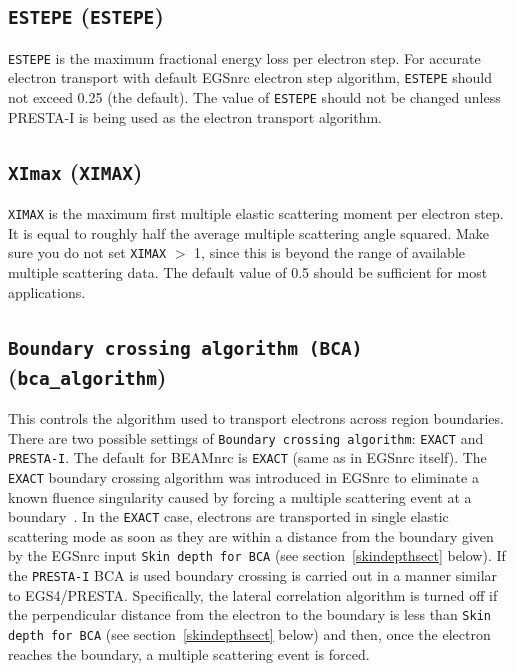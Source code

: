 \documentclass[12pt,twoside]{article}
\begin{document}
\subsection{{\tt ESTEPE} ({\tt ESTEPE})}
\label{ESTEPE}
{\tt ESTEPE} is the maximum fractional energy loss per electron step.
For accurate electron transport with default EGSnrc electron
step algorithm,  {\tt ESTEPE} should
not exceed 0.25 (the default).  The value of {\tt ESTEPE} should not be changed
unless PRESTA-I is being used as
the electron transport algorithm.

\subsection{{\tt XImax} ({\tt XIMAX})}
{\tt XIMAX} is the maximum first multiple elastic scattering moment per electron
step.  It is equal to roughly half the average multiple scattering angle
squared.  Make sure you do not set {\tt XIMAX} $>$ 1,
since this is beyond the range of available multiple scattering data.
The default value of 0.5 should be sufficient for most applications.

\subsection{{\tt Boundary crossing algorithm (BCA)} ({\tt bca\_algorithm})}
\label{bcasect}

This controls the algorithm used to transport electrons across region
boundaries.  There are two possible settings of
{\tt Boundary crossing algorithm}: {\tt EXACT} and
{\tt PRESTA-I}. The default for BEAMnrc is {\tt EXACT} (same as in
EGSnrc itself).
The {\tt EXACT} boundary
crossing algorithm was introduced in EGSnrc to eliminate a
known fluence singularity caused by forcing a
multiple scattering event at a boundary~\cite{FS95}.
In the {\tt EXACT} case, electrons are
transported in
single elastic scattering mode as soon as they are within a distance from
the boundary given by the EGSnrc input {\tt Skin depth for BCA} (see
section~\ref{skindepthsect} below).
If the {\tt PRESTA-I} BCA is used boundary
crossing is carried out in a manner similar to EGS4/PRESTA.
Specifically, the lateral correlation algorithm is
turned off if the perpendicular distance
from the electron to the boundary is less than
{\tt Skin depth for BCA} (see
section~\ref{skindepthsect} below) and then, once the electron reaches
the boundary, a multiple scattering event is forced.
\end{document}
